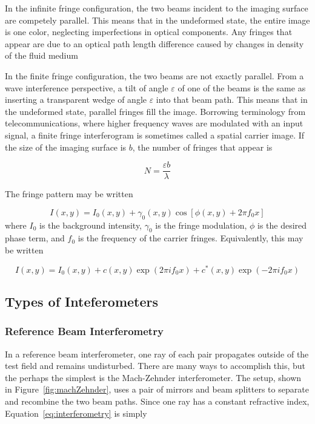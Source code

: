 \documentclass[11pt]{article} %
\begin{document}
In the infinite fringe configuration, the two beams incident to the imaging surface are competely parallel. This means that in the undeformed state, the entire image is one color, neglecting imperfections in optical components. Any fringes that appear are due to an optical path length difference caused by changes in density of the fluid medium

In the finite fringe configuration, the two beams are not exactly parallel. From a wave interference perspective, a tilt of angle $\varepsilon$ of one of the beams is the same as inserting a transparent wedge of angle $\varepsilon$ into that beam path. This means that in the undeformed state, parallel fringes fill the image. Borrowing terminology from telecommunications, where higher frequency waves are modulated with an input signal, a finite fringe interferogram is sometimes called a spatial carrier image. If the size of the imaging surface is $b$, the number of fringes that appear is

\begin{equation}
	N= \frac{\varepsilon b}{\lambda}
	\label{eq:numFringes}
\end{equation}

The fringe pattern may be written

\begin{equation}
	I(x,y)=I_0(x,y)+\gamma_0(x,y) \cos[\phi(x,y) + 2 \pi f_0 x]
	\label{eq:fringe_intensity}
\end{equation}
where $I_0$ is the background intensity, $\gamma_0$ is the fringe modulation, $\phi$ is the desired phase term, and $f_0$ is the frequency of the carrier fringes. Equivalently, this may be written

\begin{equation}
	I(x,y) = I_0(x,y) + c(x,y) \exp(2 \pi i f_0 x) + c^*(x,y) \exp(-2 \pi i f_0 x)
	\label{eq:fringe_complex}
\end{equation}




\subsection{Types of Inteferometers}

\subsubsection{Reference Beam Interferometry}

In a reference beam interferometer, one ray of each pair propagates outside of the test field and remains undisturbed. There are many ways to accomplish this, but the perhaps the simplest is the Mach-Zehnder interferometer. The setup, shown in Figure~\ref{fig:machZehnder}, uses a pair of mirrors and beam splitters to separate and recombine the two beam paths. Since one ray has a constant refractive index, Equation~\ref{eq:interferometry} is simply
\end{document}
